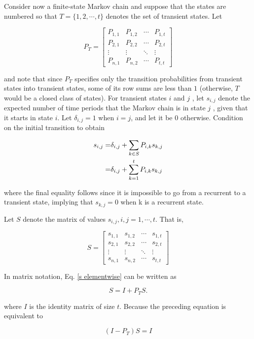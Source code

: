 Consider now a finite-state Markov chain and suppose that the states are numbered so that $T = \{1, 2, \cdots , t\}$ denotes the set of transient states. Let

$$
P_T = \begin{bmatrix}
    P_{1,1} & P_{1,2} & \cdots & P_{1, t} \\ 
    P_{2,1} & P_{2,2} & \cdots & P_{2, t} \\ 
    \vdots & \vdots & \ddots & \vdots \\ 
    P_{n,1} & P_{n,2} & \cdots & P_{t,t}
\end{bmatrix}
$$

and note that since $P_T$ specifies only the transition probabilities from transient states into transient states, some of its row sums are less than $1$ (otherwise, $T$ would be a closed class of states). For transient states $i$ and $j$ , let $s_{i,j}$ denote the expected number of time periods that the Markov chain is in state $j$ , given that it starts in state $i$. Let $\delta_{i,j} = 1$ when $i = j$, and let it be $0$ otherwise. Condition on the initial transition to obtain

\begin{align}
    s_{i,j} = & \delta_{i,j} + \sum_{k \in S} P_{i,k} s_{k,j} \notag \\ 
    = & \delta_{i,j} + \sum_{k=1}^t P_{i,k} s_{k,j} \label{s elementwise}
\end{align}

where the final equality follows since it is impossible to go from a recurrent to a transient state, implying that $s_{k,j} = 0$ when k is a recurrent state.

Let $S$ denote the matrix of values $s_{i,j} , i, j = 1, \cdots , t$. That is,

$$
S = \begin{bmatrix}
    s_{1,1} & s_{1,2} & \cdots & s_{1, t} \\ 
    s_{2,1} & s_{2,2} & \cdots & s_{2, t} \\ 
    \vdots & \vdots & \ddots & \vdots \\ 
    s_{n,1} & s_{n,2} & \cdots & s_{t,t}
\end{bmatrix}
$$

In matrix notation, Eq. \eqref{s elementwise} can be written as

$$
S = I + P_T S.
$$

where $I$ is the identity matrix of size $t$. Because the preceding equation is equivalent to

$$
(I - P_T)S = I
$$

